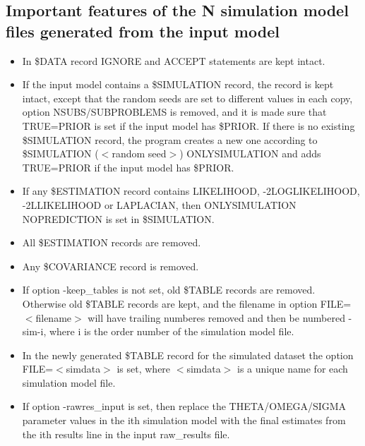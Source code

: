 \subsection{Important features of the N simulation model files generated from the input model}
\begin{itemize}
	\item In \$DATA record IGNORE and ACCEPT statements are kept intact.
	\item If the input model contains a \$SIMULATION record, the record is kept intact, except that the random seeds are set to different values in each copy, option NSUBS/SUBPROBLEMS is removed, and it is made sure that TRUE=PRIOR is set if the input model has \$PRIOR. If there is no existing \$SIMULATION record, the program creates a new one according to \$SIMULATION ($<$random seed$>$) ONLYSIMULATION and adds TRUE=PRIOR if the input model has \$PRIOR.
	\item If any \$ESTIMATION record contains LIKELIHOOD, -2LOGLIKELIHOOD, -2LLIKELIHOOD or LAPLACIAN, then ONLYSIMULATION NOPREDICTION is set in \$SIMULATION.  
	\item All \$ESTIMATION records are removed. 
	\item Any \$COVARIANCE record is removed. 
	\item If option -keep\_tables is not set, old \$TABLE records are removed. Otherwise old \$TABLE records are kept, and the filename in option FILE=$<$filename$>$ will have trailing numberes removed and then be numbered -sim-i, where i is the order number of the simulation model file. 
	\item In the newly generated \$TABLE record for the simulated dataset the option FILE=$<$simdata$>$ is set, where $<$simdata$>$ is a unique name for each simulation model file.
	\item If option -rawres\_input is set, then replace the THETA/OMEGA/SIGMA parameter values in the ith simulation model with the final estimates from the ith results line in the input raw\_results file.
\end{itemize}

